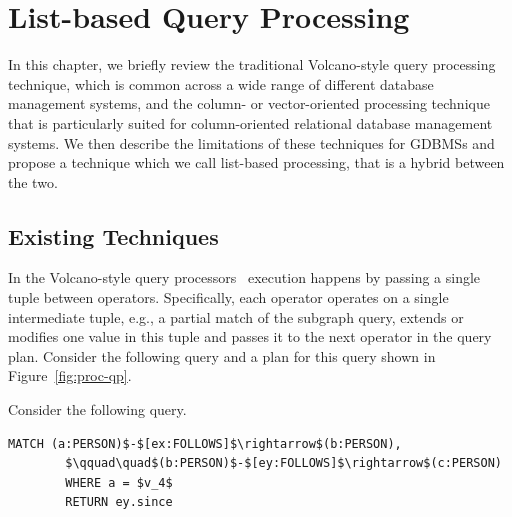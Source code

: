 \chapter{List-based Query Processing}
\label{list-based-processing}

In this chapter, we briefly review the traditional Volcano-style query processing technique, which is common across a wide range of different database management systems, and the column- or vector-oriented processing technique that is particularly suited for column-oriented relational database management systems. We then describe the limitations of these techniques for GDBMSs and propose a technique which we call list-based processing, that is a hybrid between the two.

\section{Existing Techniques}
\label{sec:existing-techniques}
In the Volcano-style query processors~\cite{volcano} execution happens by passing a single tuple between operators. Specifically, each operator operates on a single intermediate tuple, e.g., a partial match of the subgraph query, extends or modifies one value in this tuple and passes it to the next operator in the query plan. Consider the following query and a plan for this query shown in Figure~\ref{fig:proc-qp}.

\begin{example}
	\label{ex:proc-example}
	Consider the following query. 
	{\em 
		\begin{lstlisting}[numbers=none, showstringspaces=false,belowskip=0pt ]
		MATCH (a:PERSON)$-$[ex:FOLLOWS]$\rightarrow$(b:PERSON),
		$\qquad\quad$(b:PERSON)$-$[ey:FOLLOWS]$\rightarrow$(c:PERSON)
		WHERE a = $v_4$
		RETURN ey.since\end{lstlisting}
	}
\end{example}

